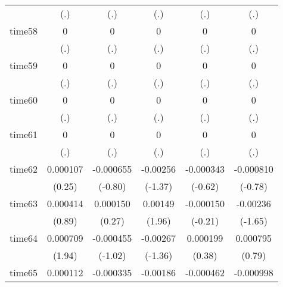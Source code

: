 \begin{table}[htbp]
\begin{tabular}{l*{5}{c}}
            &         (.)         &         (.)         &         (.)         &         (.)         &         (.)         \\
time58      &           0         &           0         &           0         &           0         &           0         \\
            &         (.)         &         (.)         &         (.)         &         (.)         &         (.)         \\
time59      &           0         &           0         &           0         &           0         &           0         \\
            &         (.)         &         (.)         &         (.)         &         (.)         &         (.)         \\
time60      &           0         &           0         &           0         &           0         &           0         \\
            &         (.)         &         (.)         &         (.)         &         (.)         &         (.)         \\
time61      &           0         &           0         &           0         &           0         &           0         \\
            &         (.)         &         (.)         &         (.)         &         (.)         &         (.)         \\
time62      &    0.000107         &   -0.000655         &    -0.00256         &   -0.000343         &   -0.000810         \\
            &      (0.25)         &     (-0.80)         &     (-1.37)         &     (-0.62)         &     (-0.78)         \\
time63      &    0.000414         &    0.000150         &     0.00149\sym{*}  &   -0.000150         &    -0.00236         \\
            &      (0.89)         &      (0.27)         &      (1.96)         &     (-0.21)         &     (-1.65)         \\
time64      &    0.000709         &   -0.000455         &    -0.00267         &    0.000199         &    0.000795         \\
            &      (1.94)         &     (-1.02)         &     (-1.36)         &      (0.38)         &      (0.79)         \\
time65      &    0.000112         &   -0.000335         &    -0.00186         &   -0.000462         &   -0.000998         \\

\end{tabular}
\end{table}
